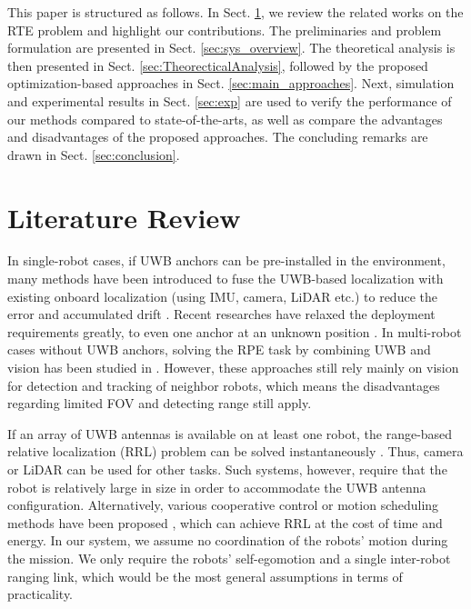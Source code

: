 \documentclass[journal]{IEEEtran}
\begin{document}
This paper is structured as follows. In Sect. \ref{sec:lit_review}, we review the related works on the RTE problem and highlight our contributions. The preliminaries and problem formulation are presented in Sect. \ref{sec:sys_overview}. The theoretical analysis is then presented in Sect. \ref{sec:TheorecticalAnalysis}, followed by the proposed optimization-based approaches in Sect. \ref{sec:main_approaches}. Next, simulation and experimental results in Sect. \ref{sec:exp} are used to verify the performance of our methods compared to state-of-the-arts, as well as compare the advantages and disadvantages of the proposed approaches. The concluding remarks are drawn in Sect. \ref{sec:conclusion}.

\section{Literature Review} \label{sec:lit_review}

In single-robot cases, if UWB anchors can be pre-installed in the environment, many methods have been introduced to fuse the UWB-based localization with existing onboard localization (using IMU, camera, LiDAR etc.) to reduce the error and accumulated drift \cite{yu2021applications,nguyen2020ranging}. Recent researches have relaxed the deployment requirements greatly, to even one anchor at an unknown position \cite{cao2020vir,Thien2020AuRO}.
In multi-robot cases without UWB anchors, solving the RPE task by combining UWB and vision has been studied in \cite{cao2020vir,xu2020decentralized}. However, these approaches still rely mainly on vision for detection and tracking of neighbor robots, which means the disadvantages regarding limited FOV and detecting range still apply.

If an array of UWB antennas is available on at least one robot, the range-based relative localization (RRL) problem can be solved instantaneously \cite{guler2021reloc,xianjia2021cooperative,shalaby2021relative,nguyen2018robust}. Thus, camera or LiDAR can be used for other tasks. Such systems, however, require that the robot is relatively large in size in order to accommodate the UWB antenna configuration. Alternatively, various cooperative control or motion scheduling methods have been proposed \cite{shule2020mulituwbsurvey,nguyen2019persistently,guo2019ultra,cornejo2015distributed}, which can achieve RRL at the cost of time and energy.
In our system, we assume no coordination of the robots' motion during the mission. We only require the robots' self-egomotion and a single inter-robot ranging link, which would be the most general assumptions in terms of practicality.
\end{document}
